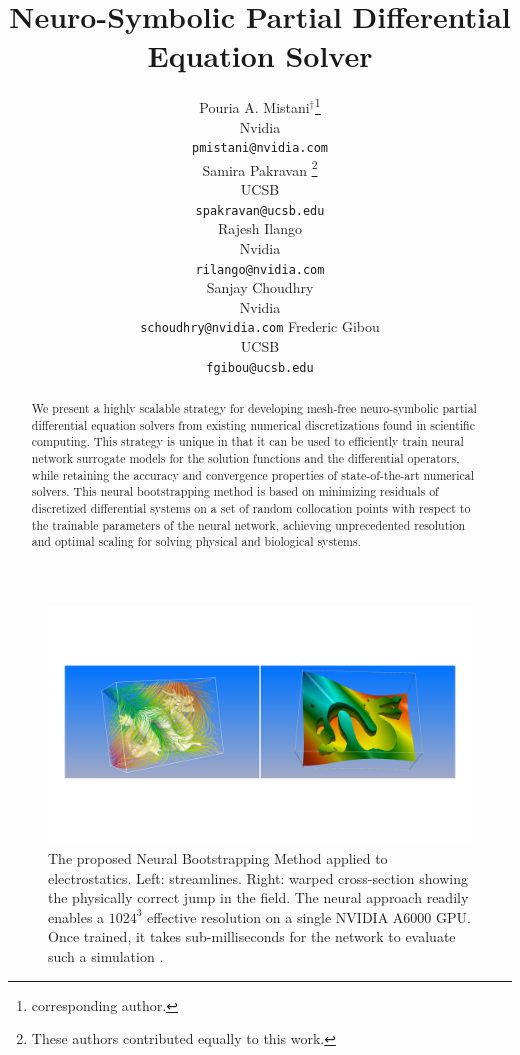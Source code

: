 \documentclass{article}
\title{Neuro-Symbolic Partial Differential Equation Solver}
\author{
  Pouria A. Mistani$^\dagger$\thanks{corresponding author.} \\
  Nvidia \\
  \texttt{pmistani@nvidia.com} \\
  \And
  Samira Pakravan \thanks{These authors contributed equally to this work.}\\
  UCSB \\
  \texttt{spakravan@ucsb.edu} \\
  \And
  Rajesh Ilango \\
  Nvidia \\
  \texttt{rilango@nvidia.com} \\
  \AND
  Sanjay Choudhry \\
  Nvidia \\
  \texttt{schoudhry@nvidia.com}
  \And  
  Frederic Gibou \\
  UCSB \\
  \texttt{fgibou@ucsb.edu} \\
}
\begin{document}
\maketitle

\vspace{-0.5cm}
\begin{figure}[h]
\centering
\includegraphics[width=0.99\linewidth]{figures/twoDragons.pdf}
\caption{The proposed Neural Bootstrapping Method applied to electrostatics. Left: streamlines. Right: warped cross-section showing the physically correct jump in the field. The neural approach readily enables a $1024^3$ effective resolution on a single NVIDIA A6000 GPU. Once trained, it takes sub-milliseconds for the network to evaluate such a simulation \cite{tiny-cuda-nn}.}
\label{fig:dragon}
\end{figure}

\begin{abstract}
 
  We present a highly scalable strategy for developing mesh-free neuro-symbolic partial differential equation solvers from existing numerical discretizations found in scientific computing. This strategy is unique in that it can be used to efficiently train neural network surrogate models for the solution functions and the differential operators, while retaining the accuracy and convergence properties of state-of-the-art numerical solvers. This neural bootstrapping method is based on minimizing residuals of discretized differential systems on a set of random collocation points with respect to the trainable parameters of the neural network, achieving unprecedented resolution and optimal scaling for solving physical and biological systems.
\end{abstract}

\end{document}
